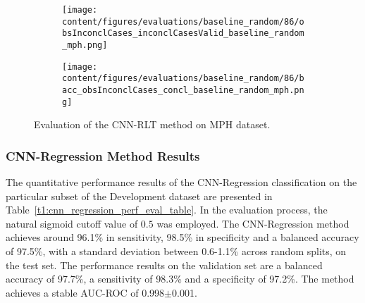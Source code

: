 \begin{figure}[ht]
  \begin{subfigure}{0.9\textwidth}
    \centering
    \texttt{[image: content/figures/evaluations/baseline\_random/86/obsInconclCases\_inconclCasesValid\_baseline\_random\_mph.png]}
    \label{fig:obsInconclCases_inconclCasesValid_baseline_random_mph}
  \end{subfigure}
  \hfill
  \begin{subfigure}{0.9\textwidth}
    \centering
    \texttt{[image: content/figures/evaluations/baseline\_random/86/bacc\_obsInconclCases\_concl\_baseline\_random\_mph.png]}
    \label{fig:bacc_obsInconclCases_concl_baseline_random_mph}
  \end{subfigure}
  \caption{Evaluation of the CNN-RLT method on MPH dataset.}
  \label{fig:perf_eval_rlt_mph}
\end{figure}


\subsubsection{CNN-Regression Method Results}
\label{subsubsec:eval_regression}




The quantitative performance results of the CNN-Regression classification on the 
particular subset of the Development dataset are presented in Table~\ref{t1:cnn_regression_perf_eval_table}.
In the evaluation process, the natural sigmoid cutoff value of $0.5$ was employed.
The CNN-Regression method achieves around 96.1\% in sensitivity, 98.5\% in specificity and a balanced accuracy of 97.5\%, 
with a standard deviation between 0.6-1.1\% across random splits, on the test set.
The performance results on the validation set are a balanced accuracy of 97.7\%, a sensitivity of 98.3\% 
and a specificity of 97.2\%.
The method achieves a stable AUC-ROC of 0.998$\pm$0.001.


